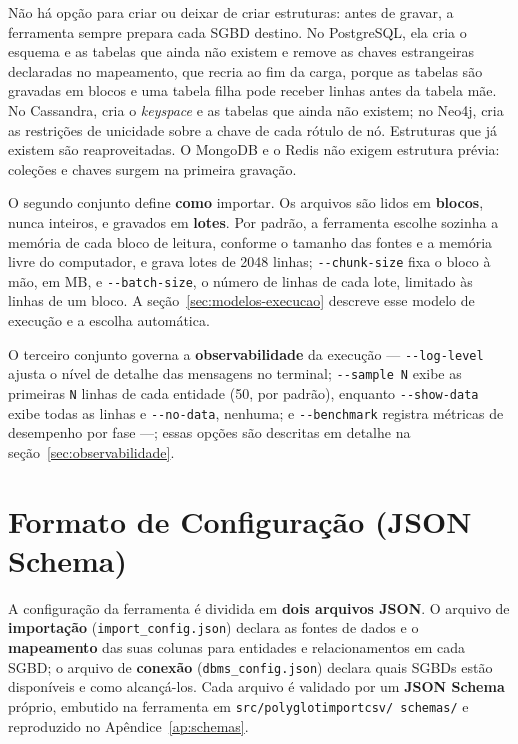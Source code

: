 Não há opção para criar ou deixar de criar estruturas: antes de gravar, a ferramenta
sempre prepara cada SGBD destino. No PostgreSQL, ela cria o esquema e as tabelas que ainda
não existem e remove as chaves estrangeiras declaradas no mapeamento, que recria ao fim da
carga, porque as tabelas são gravadas em blocos e uma tabela filha pode receber linhas
antes da tabela mãe. No Cassandra, cria o \textit{keyspace} e as tabelas que ainda não
existem; no Neo4j, cria as restrições de unicidade sobre a chave de cada rótulo de nó.
Estruturas que já existem são reaproveitadas. O MongoDB e o Redis não exigem estrutura
prévia: coleções e chaves surgem na primeira gravação.

O segundo conjunto define \textbf{como} importar. Os arquivos são lidos em
\textbf{blocos}, nunca inteiros, e gravados em \textbf{lotes}. Por padrão, a ferramenta
escolhe sozinha a memória de cada bloco de leitura, conforme o tamanho das fontes e a
memória livre do computador, e grava lotes de \num{2048} linhas;
\texttt{-{}-chunk-size} fixa o bloco à mão, em MB, e \texttt{-{}-batch-size}, o número de
linhas de cada lote, limitado às linhas de um bloco. A seção~\ref{sec:modelos-execucao}
descreve esse modelo de execução e a escolha automática.

O terceiro conjunto governa a \textbf{observabilidade} da execução ---
\texttt{-{}-log-level} ajusta o nível de detalhe das mensagens no terminal;
\texttt{-{}-sample}~\texttt{N} exibe as primeiras \texttt{N} linhas de cada entidade (50,
por padrão), enquanto \texttt{-{}-show-data} exibe todas as linhas e \texttt{-{}-no-data},
nenhuma; e \texttt{-{}-benchmark} registra métricas de desempenho por fase ---; essas
opções são descritas em detalhe na seção~\ref{sec:observabilidade}.


\section{Formato de Configuração (JSON Schema)}
\label{sec:config-format}

A configuração da ferramenta é dividida em \textbf{dois arquivos JSON}. O arquivo de
\textbf{importação} (\texttt{import\_config.json}) declara as fontes de dados e o
\textbf{mapeamento} das suas colunas para entidades e relacionamentos em cada SGBD; o
arquivo de \textbf{conexão} (\texttt{dbms\_config.json}) declara quais SGBDs estão
disponíveis e como alcançá-los. Cada arquivo é validado por um \textbf{JSON Schema}
próprio, embutido na ferramenta em \texttt{src/\allowbreak polyglotimportcsv/\allowbreak
schemas/} e reproduzido no Apêndice~\ref{ap:schemas}.

